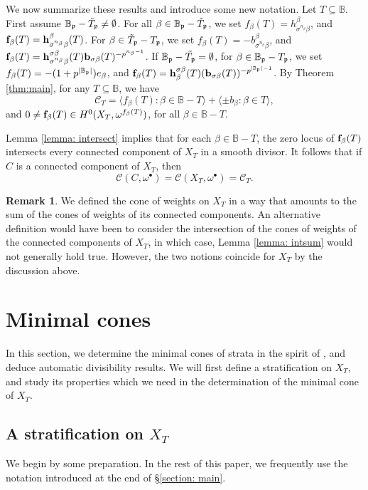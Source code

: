 \documentclass[11pt,pdflatex]{amsart}
\theoremstyle{plain}
\theoremstyle{definition}
\newtheorem{remark}[theorem]{Remark}
\theoremstyle{plain}
\theoremstyle{definition}
\theoremstyle{remark}
\numberwithin{equation}{section}
\numberwithin{figure}{section} \numberwithin{table}{subsection}
\newcommand{\gerp}{{\frak{p}}}
\newcommand{\calC}{{\mathcal{C}}}
\def\BB{\mathbb{B}}
\begin{document}
We now summarize these results and introduce some new notation. Let $T \subseteq \BB$.
First assume $\BB_\gerp-\tilde{T}_\gerp\neq \emptyset$. For all $\beta \in \BB_\gerp-\tilde{T}_\gerp$, we set $f_\beta(T)=h^{\beta}_{\sigma^{n_\beta}{\beta}}$, and ${\bf f}_\beta(T)={\bf h}^{\beta}_{\sigma^{n_\beta}{\beta}}(T)$. For $\beta \in \tilde{T}_\gerp-T_\gerp$, we set $f_\beta(T)=-b^{\beta}_{\sigma^{n_\beta}{\beta}}$, and  ${\bf f}_\beta(T)={\bf h}^{\sigma\beta}_{\sigma^{n_\beta}\beta}(T){\bf b}_{\sigma\beta}(T)^{-p^{n_\beta-1}}$. If $\BB_\gerp-\tilde{T_\gerp}= \emptyset$, for $\beta \in \BB_\gerp-T_\gerp$, we set $f_\beta(T)=-(1+p^{|\BB_\gerp|})e_\beta$, and ${\bf f}_\beta(T)={\bf h}_\beta^{\sigma\beta}(T)({\bf b}_{\sigma\beta}(T))^{-p^{|\BB_\gerp|-1}}$. By Theorem \ref{thm:main}, for any $T \subseteq \BB$, we have 
\[
\calC_T=\langle f_\beta(T): \beta \in \BB-T \rangle + \langle \pm b_\beta: \beta \in T \rangle,
\]
and $0 \neq {\bf f}_\beta(T) \in H^0(X_T,\omega^{f_\beta(T)})$, for all $\beta \in \BB-T$.

Lemma \ref{lemma: intersect} implies that for each $\beta \in \BB-T$, the zero locus of ${\bf f}_\beta(T)$ intersects every connected component of $X_T$ in a smooth divisor. It follows that if $C$ is a connected component of $X_T$, then $$\calC(C,\omega^{\bullet})=\calC(X_T,\omega^{\bullet})=\calC_T.$$



\begin{remark} We defined the cone of weights on $X_T$ in a way that amounts to the sum of the cones of weights of its connected components. An alternative definition would have been to consider the intersection of the cones of weights of the connected components of $X_T$, in which case, Lemma \ref{lemma: intsum} would not generally hold true. However, the two notions coincide for $X_T$ by the discussion above. \end{remark}

\section{Minimal cones} In this section, we determine the minimal cones of strata in the spirit of \cite{DK1,DK2}, and deduce automatic divisibility results. We will first define a stratification on $X_T$, and study its properties which we need in the determination of the minimal cone of $X_T$.

\subsection{A stratification on $X_T$} \label{subsection: stratification} We begin by some preparation. In the rest of this paper, we frequently use the notation introduced at the end of \S \ref{section: main}.
\end{document}
